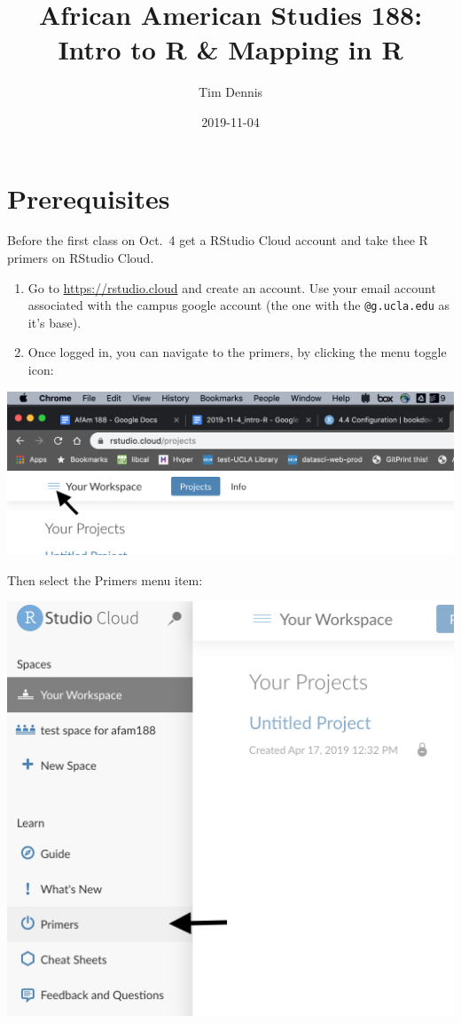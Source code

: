 \documentclass[]{book}
\title{African American Studies 188: Intro to R \& Mapping in R}
\author{Tim Dennis}
\date{2019-11-04}
\begin{document}
\maketitle

{
\setcounter{tocdepth}{1}
\tableofcontents
}
\hypertarget{prerequisites}{%
\chapter{Prerequisites}\label{prerequisites}}

Before the first class on Oct.~4 get a RStudio Cloud account and take thee R primers on RStudio Cloud.

\begin{enumerate}
\def\labelenumi{\arabic{enumi}.}
\item
  Go to \url{https://rstudio.cloud} and create an account. Use your email account associated with the campus google account (the one with the \texttt{@g.ucla.edu} as it's base).
\item
  Once logged in, you can navigate to the primers, by clicking the menu toggle icon:
\end{enumerate}

\includegraphics[width=0.9\linewidth]{images/rstudio-cloud}

Then select the Primers menu item:

\includegraphics[width=0.9\linewidth]{images/primers}
\end{document}
